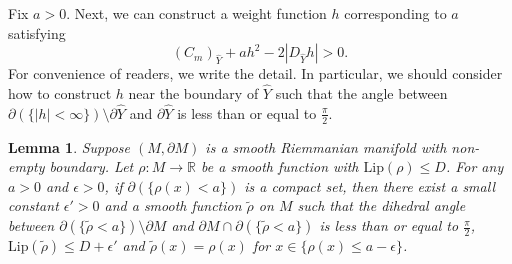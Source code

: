 \documentclass[11pt,letterpaper]{amsart}
\newtheorem{lemma}[theorem]{Lemma}
\theoremstyle{definition}
\theoremstyle{remark}
\numberwithin{equation}{section}
\begin{document}
Fix $a>0$. Next, we can construct a weight function $h$ corresponding to $a$ satisfying 
\begin{equation}\label{equ about h}
(C_{m})_{\hat{Y}}+a h^2-2|D_{\hat{Y}}h|>0.
\end{equation}
For convenience of readers, we write the detail. In particular, we should consider how to construct $h$ near the boundary of $\hat{Y}$ such that the angle between $\partial(\{|h|<\infty\})\setminus \partial\hat{Y}$ and $\partial \hat{Y}$ is less than or equal to $\frac{\pi}{2}$.

\begin{lemma}\label{acute angle}
    Suppose $(M,\partial M)$ is a smooth Riemmanian manifold with non-empty boundary. Let $\rho:M\rightarrow \mathbb{R}$ be a smooth function with $\text{Lip}(\rho)\leq D$. For any $a>0$ and $\epsilon>0$, if $\partial(\{\rho(x)< a\})$ is a compact set, then there exist a small constant $\epsilon'>0$ and a smooth function $\tilde{\rho}$ on $M$ such that  the dihedral angle between $  \partial(\{\tilde{\rho}<a\})\setminus \partial M$ and $ \partial M\cap \partial(\{\tilde{\rho}<a\})$ is less than or equal to $\frac{\pi}{2}$, $\text{Lip}(\tilde{\rho})\leq D+\epsilon'$ and $\tilde{\rho}(x)=\rho(x)$ for $x\in \{\rho(x)\leq a-\epsilon\}$. 
\end{lemma}
\end{document}
